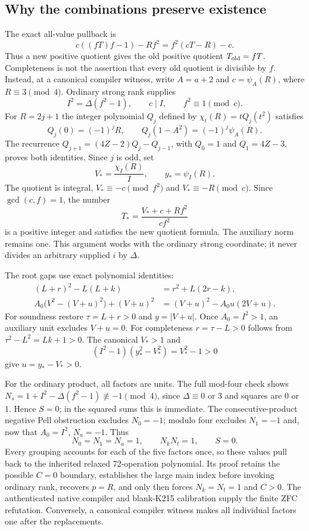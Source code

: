 \subsection{Why the combinations preserve existence}
The exact all-value pullback is
\[
 c((fT)f-1)-Rf^2=f^2(cT-R)-c.
\]
Thus a new positive quotient gives the old positive quotient $T_{\rm old}=fT$.
Completeness is not the assertion that every old quotient is divisible by $f$.
Instead, at a canonical compiler witness, write $A=a+2$ and
$c=\psi_A(R)$, where $R\equiv3\pmod4$. Ordinary strong rank supplies
\[
 I^2=\Delta(f^2-1),\qquad c\mid I,\qquad f^2\equiv1\pmod c.
\]
For $R=2j+1$ the integer polynomial $Q_j$ defined by
$\chi_t(R)=tQ_j(t^2)$ satisfies
\[
 Q_j(0)=(-1)^jR,\qquad Q_j(1-A^2)=(-1)^j\psi_A(R).
\]
The recurrence $Q_{j+1}=(4Z-2)Q_j-Q_{j-1}$, with $Q_0=1$ and
$Q_1=4Z-3$, proves both identities. Since $j$ is odd, set
\[
 V_*=\frac{\chi_I(R)}{I},\qquad y_* =\psi_I(R).
\]
The quotient is integral, $V_*\equiv-c\pmod{f^2}$ and
$V_*\equiv-R\pmod c$. Since $\gcd(c,f)=1$, the number
\[
 T_*=\frac{V_*+c+Rf^2}{cf^2}
\]
is a positive integer and satisfies the new quotient formula. The auxiliary
norm remains one. This argument works with the ordinary strong coordinate;
it never divides an arbitrary supplied $i$ by $\Delta$.

The root gaps use exact polynomial identities:
\begin{align*}
 (L+r)^2-L(L+k)&=r^2+L(2r-k),\\
 A_0\bigl(V^2-(V+u)^2\bigr)+(V+u)^2
   &=(V+u)^2-A_0u(2V+u).
\end{align*}
For soundness restore $\tau=L+r>0$ and $y=|V+u|$.
Once $A_0=I^2>1$, an auxiliary unit excludes $V+u=0$.
For completeness $r=\tau-L>0$ follows from
$\tau^2-L^2=Lk+1>0$. The canonical $V_*>1$ and
\[
 (I^2-1)(y_*^2-V_*^2)=V_*^2-1>0
\]
give $u=y_*-V_*>0$.

For the ordinary product, all factors are units. The full mod-four check
shows $N_s=1+I^2-\Delta(f^2-1)\not\equiv-1\pmod4$, since
$\Delta\equiv0$ or $3$ and squares are $0$ or $1$. Hence $S=0$;
in the squared sums this is immediate. The consecutive-product negative
Pell obstruction excludes $N_0=-1$; modulo four excludes $N_1=-1$
and, now that $A_0=I^2$, $N_a=-1$. Thus
\[
 N_0=N_1=N_a=1,\qquad N_kN_t=1,\qquad S=0.
\]
Every grouping accounts for each of the five factors once, so these values
pull back to the inherited relaxed 72-operation polynomial. Its proof
retains the possible $C=0$ boundary, establishes the large main index
before invoking ordinary rank, recovers $p=R$, and only then forces
$N_k=N_t=1$ and $C>0$. The authenticated native compiler and blank-K215
calibration supply the finite ZFC refutation. Conversely, a canonical
compiler witness makes all individual factors one after the replacements.

